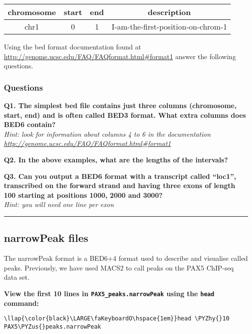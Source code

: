 \documentclass[11pt]{article}
\def\PYZus{\char`\_}
\def\PYZhy{\char`\-}
\begin{document}
    \begin{longtable}[]{@{}cccc@{}}
\hline
chromosome & start & end & description\tabularnewline
\hline
\endhead
chr1 & 0 & 1 & I-am-the-first-position-on-chrom-1\tabularnewline
\hline
\end{longtable}

    Using the bed format documentation found at
\url{http://genome.ucsc.edu/FAQ/FAQformat.html\#format1} answer the
following questions.

    \hypertarget{questions}{%
\subsubsection{Questions}\label{questions}}

\textbf{Q1. The simplest bed file contains just three columns
(chromosome, start, end) and is often called BED3 format. What extra
columns does BED6 contain?}\\
\textit{Hint: look for information about columns 4 to 6 in the
documentation \url{http://genome.ucsc.edu/FAQ/FAQformat.html\#format1}}

\textbf{Q2. In the above examples, what are the lengths of the
intervals?}

\textbf{Q3. Can you output a BED6 format with a transcript called
``loc1'', transcribed on the forward strand and having three exons of
length 100 starting at positions 1000, 2000 and 3000?}\\
\textit{Hint: you will need one line per exon}

    \begin{center}\rule{0.5\linewidth}{.4pt}\end{center}

    \hypertarget{narrowpeak-files}{%
\subsection{narrowPeak files}\label{narrowpeak-files}}

The narrowPeak format is a BED6+4 format used to describe and visualise
called peaks. Previously, we have used MACS2 to call peaks on the PAX5
ChIP-seq data set.

    \textbf{View the first 10 lines in \texttt{PAX5\_peaks.narrowPeak} using
the \texttt{head} command:}





\begin{terminalinput}
\begin{Verbatim}[commandchars=\\\{\}]
\llap{\color{black}\LARGE\faKeyboardO\hspace{1em}}head \PYZhy{}10 PAX5\PYZus{}peaks.narrowPeak
\end{Verbatim}
\end{terminalinput}
\end{document}
